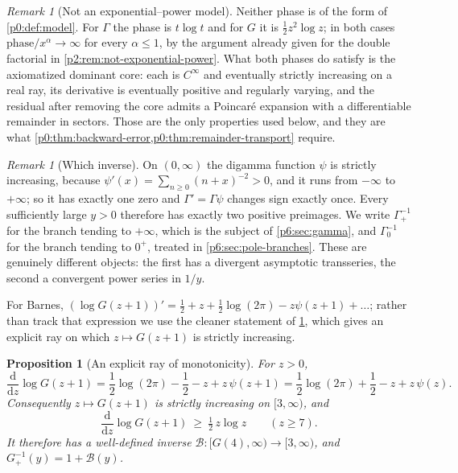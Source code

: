 \documentclass[11pt,a4paper,oneside]{book}
\theoremstyle{plain}
\newtheorem{proposition}[theorem]{Proposition}
\theoremstyle{definition}
\theoremstyle{remark}
\newtheorem{remark}[theorem]{Remark}
\newcommand{\dd}{\mathrm{d}}
\begin{document}
\begin{remark}[Not an exponential--power model]\label{p6:rem:not-a-model}
Neither phase is of the form of \cref{p0:def:model}.  For $\Gamma$ the phase
is $t\log t$ and for $G$ it is $\tfrac12z^{2}\log z$; in both cases
$\text{phase}/x^{\alpha}\to\infty$ for every $\alpha\le1$, by the argument
already given for the double factorial in \cref{p2:rem:not-exponential-power}.  What
both phases do satisfy is the axiomatized dominant core: each is
$C^{\infty}$ and eventually strictly increasing on a real ray, its derivative
is eventually positive and regularly varying, and the residual after removing
the core admits a Poincar\'e expansion with a differentiable remainder in
sectors.  Those are the only properties used below, and they are what
\cref{p0:thm:backward-error,p0:thm:remainder-transport} require.
\end{remark}

\begin{remark}[Which inverse]\label{p6:rem:which-inverse}
On $(0,\infty)$ the digamma function $\psi$ is strictly increasing, because
$\psi'(x)=\sum_{n\ge0}(n+x)^{-2}>0$, and it runs from $-\infty$ to $+\infty$;
so it has exactly one zero and $\Gamma'=\Gamma\psi$ changes sign exactly once.
Every sufficiently large $y>0$ therefore has exactly two positive preimages.
We write $\Gamma_+^{-1}$ for the branch tending to $+\infty$, which is the
subject of \cref{p6:sec:gamma}, and $\Gamma_0^{-1}$ for the branch tending to
$0^{+}$, treated in \cref{p6:sec:pole-branches}.  These are genuinely
different objects: the first has a divergent asymptotic transseries, the
second a convergent power series in $1/y$.

For Barnes, $(\log G(z+1))'=\tfrac12+z+\tfrac12\log(2\pi)-z\psi(z+1)+\dots$;
rather than track that expression we use the cleaner statement of
\cref{p6:prop:barnes-monotone}, which gives an explicit ray on which
$z\mapsto G(z+1)$ is strictly increasing.
\end{remark}

\begin{proposition}[An explicit ray of monotonicity]
\label{p6:prop:barnes-monotone}
For $z>0$,
\begin{equation}\label{p6:eq:barnes-log-derivative}
 \frac{\dd}{\dd z}\log G(z+1)
 =\frac12\log(2\pi)-\frac12-z+z\,\psi(z+1)
 =\frac12\log(2\pi)+\frac12-z+z\,\psi(z).
\end{equation}
Consequently $z\mapsto G(z+1)$ is strictly increasing on $[3,\infty)$, and
\begin{equation}\label{p6:eq:barnes-slope-bound}
 \frac{\dd}{\dd z}\log G(z+1)\ \ge\ \tfrac12\,z\log z
 \qquad(z\ge7).
\end{equation}
It therefore has a well-defined inverse
$\mathcal{B}:[G(4),\infty)\to[3,\infty)$, and $G_+^{-1}(y)=1+\mathcal{B}(y)$.
\end{proposition}
\end{document}
